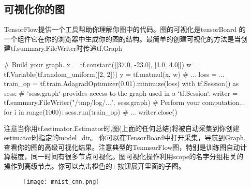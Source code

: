 \subsection{可视化你的图}
TensorFlow提供一个工具帮助你理解你图中的代码。图的可视化是tensorBoard
的一个组件它在你的浏览器中生成你的图的结构。最简单的创建可视化的方法是当创建tf.summary.FileWriter时传递tf.Graph
\begin{python}
# Build your graph.
x = tf.constant([[37.0, -23.0], [1.0, 4.0]])
w = tf.Variable(tf.random_uniform([2, 2]))
y = tf.matmul(x, w)
# ...
loss = ...
train_op = tf.train.AdagradOptimizer(0.01).minimize(loss)
with tf.Session() as sess:
# `sess.graph` provides access to the graph used in a `tf.Session`.
    writer = tf.summary.FileWriter("/tmp/log/...", sess.graph)
# Perform your computation...
for i in range(1000):
    sess.run(train_op)
      # ...
writer.close()
\end{python}
注意当你用tf.estimator.Estimator时,图(上面的任何总结)将被自动采集到你创建estimator时指定的model\_dir。
你可以在TensorBoard中打开采集，导航到Graph,查看你的图的高级可视化结果。注意典型的TenmsorFlow图，特别是训练图自动计算梯度，同一时间有很多节点可视化。图可视化操作利用scope的名字分组相关的操作到高级节点。你可以点击橙色的+按钮展开里面的子图。
\begin{figure}[H]
	\texttt{[image: mnist\_cnn.png]}
\end{figure}
